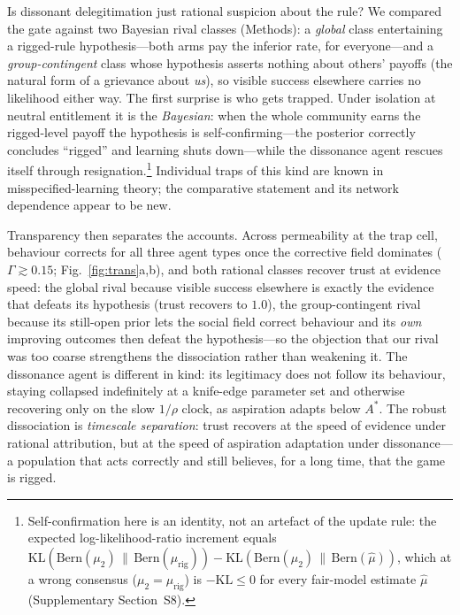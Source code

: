 \documentclass[11pt]{article}
\newcommand{\1}{\mathbf{1}}
\newcommand{\Astar}{A^{*}}
\begin{document}
Is dissonant delegitimation just rational suspicion about the rule? We compared the gate against two Bayesian rival classes (Methods): a \emph{global} class entertaining a rigged-rule hypothesis---both arms pay the inferior rate, for everyone---and a \emph{group-contingent} class whose hypothesis asserts nothing about others' payoffs (the natural form of a grievance about \emph{us}), so visible success elsewhere carries no likelihood either way. The first surprise is who gets trapped. Under isolation at neutral entitlement it is the \emph{Bayesian}: when the whole community earns the rigged-level payoff the hypothesis is self-confirming---the posterior correctly concludes ``rigged'' and learning shuts down---while the dissonance agent rescues itself through resignation.\footnote{Self-confirmation here is an identity, not an artefact of the update rule: the expected log-likelihood-ratio increment equals $\mathrm{KL}(\mathrm{Bern}(\mu_2)\,\|\,\mathrm{Bern}(\mu_{\mathrm{rig}}))-\mathrm{KL}(\mathrm{Bern}(\mu_2)\,\|\,\mathrm{Bern}(\hat\mu))$, which at a wrong consensus ($\mu_2=\mu_{\mathrm{rig}}$) is $-\mathrm{KL}\le0$ for every fair-model estimate $\hat\mu$ (Supplementary Section~S8).} Individual traps of this kind are known in misspecified-learning theory\cite{HeidhuesKoszegiStrack2018,EspondaPouzo2016}; the comparative statement and its network dependence appear to be new.

Transparency then separates the accounts. Across permeability at the trap cell, behaviour corrects for all three agent types once the corrective field dominates ($\Gamma\gtrsim0.15$; Fig.~\ref{fig:trans}a,b), and both rational classes recover trust at evidence speed: the global rival because visible success elsewhere is exactly the evidence that defeats its hypothesis (trust recovers to $1.0$), the group-contingent rival because its still-open prior lets the social field correct behaviour and its \emph{own} improving outcomes then defeat the hypothesis---so the objection that our rival was too coarse strengthens the dissociation rather than weakening it. The dissonance agent is different in kind: its legitimacy does not follow its behaviour, staying collapsed indefinitely at a knife-edge parameter set and otherwise recovering only on the slow $1/\rho$ clock, as aspiration adapts below $\Astar$. The robust dissociation is \emph{timescale separation}: trust recovers at the speed of evidence under rational attribution, but at the speed of aspiration adaptation under dissonance---a population that acts correctly and still believes, for a long time, that the game is rigged.
\end{document}
